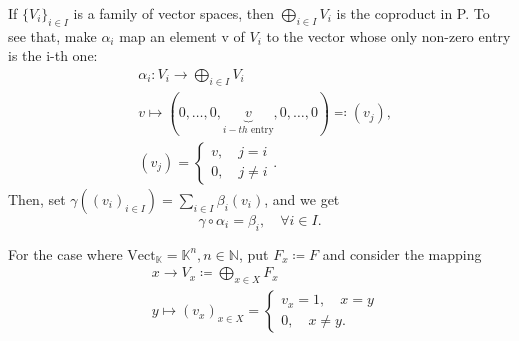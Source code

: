\documentclass[../category_theory.tex]{subfiles}
\begin{document}
\begin{example}
\begin{itemize}
\begin{center}
		      \end{center}

		      If \(\{V_{i}\}_{i\in I}\) is a family of vector spaces, then \(\bigoplus_{i\in I}V_{i}\) is the coproduct in P. To see that, make \(\alpha_{i}\) map an element v of \(V_{i}\) to the vector whose only non-zero entry is the i-th one:
		      \begin{align*}
			       & \alpha_{i}:  V_{i}\rightarrow \bigoplus_{i\in I}V_{i}                                     \\
			       & v\mapsto (0,\dotsc ,0,\underbrace{v}_{i-th \text{ entry}},0,\dotsc ,0) \eqqcolon (v_{j}), \\
			       & (v_{j}) = \left\{\begin{array}{ll}
				                          v,\quad j=i \\
				                          0, \quad j\neq  i
			                          \end{array}\right..
		      \end{align*}
		      Then, set \(\gamma ((v_{i})_{i\in I})=\sum\limits_{i\in I}^{}\beta_{i}(v_{i})\), and we get
		      \[
			      \gamma \circ \alpha_{i} = \beta_{i},\quad \forall i\in I.
		      \]

		      For the case where \(\mathrm{Vect}_{\mathbb{K}}=\mathbb{K}^{n}, n\in \mathbb{N}\), put \(F_{x}\coloneqq F\) and consider the mapping
		      \begin{align*}
			       & x\rightarrow V_{x}\coloneqq \bigoplus_{x\in X}F_{x}    \\
			       & y\mapsto (v_{x})_{x\in X}  = \left\{\begin{array}{ll}
				                                             v_{x}=1,\quad x=y \\
				                                             0, \quad x\neq y.
			                                             \end{array}\right.
		      \end{align*}
	\end{itemize}
\end{example}
\end{document}
